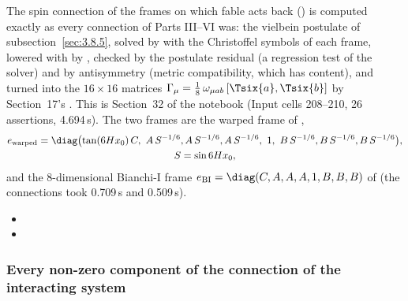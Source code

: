 The spin connection of the frames on which fable acts back () is computed exactly as
every connection of Parts III--VI was: the vielbein postulate of subsection~\ref{sec:3.8.5}, solved by
 with the Christoffel symbols of each frame, lowered with  by
, checked by the postulate residual (a regression test of the solver) and by
antisymmetry (metric compatibility, which has content), and turned into the $16\times16$ matrices
$\Gamma_\mu=\tfrac18\,\omega_{\mu ab}\,[\Tsix{a},\Tsix{b}]$ by Section~17's 
. This is Section~32 of the notebook (Input cells 208--210, 26 assertions,
4.694\,s). The two frames are the warped frame of ,
\begin{gather*}
  e_{\mathrm{warped}}=\diag\bigl(\tan(6Hx_0)\,C,\ A\,S^{-1/6},A\,S^{-1/6},A\,S^{-1/6},\ 1,\ B\,S^{-1/6},B\,S^{-1/6},B\,S^{-1/6}\bigr),\\
  S=\sin 6Hx_0 ,
\end{gather*}
and the 8-dimensional Bianchi-I frame $e_{\mathrm{BI}}=\diag(C,A,A,A,1,B,B,B)$ of  (the
connections took 0.709\,s and 0.509\,s). 
\begin{itemize}
  \item {}
  \item {}
\end{itemize}

\subsubsection{Every non-zero component of the connection of the interacting system}
\label{sec:4.4.2}

